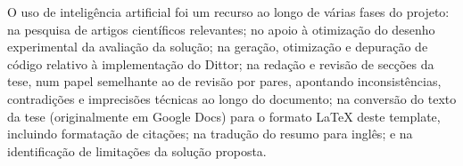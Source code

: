 







\begin{AIDcomment}
O uso de inteligência artificial foi um recurso ao longo de várias fases do projeto: na pesquisa de artigos científicos relevantes; no apoio à otimização do desenho experimental da avaliação da solução; na geração, otimização e depuração de código relativo à implementação do Dittor; na redação e revisão de secções da tese, num papel semelhante ao de revisão por pares, apontando inconsistências, contradições e imprecisões técnicas ao longo do documento; na conversão do texto da tese (originalmente em Google Docs) para o formato LaTeX deste template, incluindo formatação de citações; na tradução do resumo para inglês; e na identificação de limitações da solução proposta.
\end{AIDcomment}

